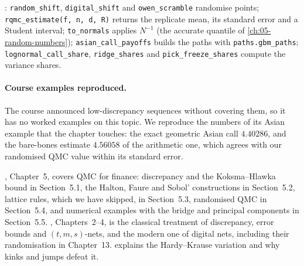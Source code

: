 \begin{incode}
: \texttt{random\_shift}, \texttt{digital\_shift} and
\texttt{owen\_scramble} randomise points; \texttt{rqmc\_estimate(f, n, d, R)} returns the
replicate mean, its standard error and a Student interval; \texttt{to\_normals} applies
$N^{-1}$ (the accurate quantile of \cref{ch:05-random-numbers}); \texttt{asian\_call\_payoffs}
builds the paths with \texttt{paths.gbm\_paths}; \texttt{lognormal\_call\_share},
\texttt{ridge\_shares} and \texttt{pick\_freeze\_shares} compute the variance shares.
\end{incode}


\paragraph{Course examples reproduced.} The course announced low-discrepancy sequences without
covering them, so it has no worked examples on this topic. We reproduce the numbers of its Asian
example that the chapter touches: the exact geometric Asian call $4.40286$, and the bare-bones
estimate $4.56058$ of the arithmetic one, which agrees with our randomised QMC value within its
standard error.

\furtherreading
\textcite{glasserman-mc}, Chapter~5, covers QMC for finance: discrepancy and the Koksma--Hlawka
bound in Section~5.1, the Halton, Faure and Sobol' constructions in Section~5.2, lattice rules,
which we have skipped, in Section~5.3, randomised QMC in Section~5.4, and numerical examples with
the bridge and principal components in Section~5.5. \textcite{niederreiter-qmc}, Chapters~2--4,
is the classical treatment of discrepancy, error bounds and $(t,m,s)$-nets, and
\textcite{dick-pillichshammer} the modern one of digital nets, including their randomisation in
Chapter~13. \textcite{owen-2005} explains the Hardy--Krause variation and why kinks and jumps
defeat it.
